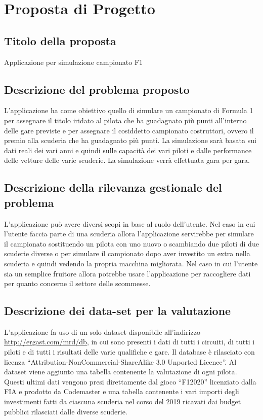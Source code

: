 \chapter{Proposta di Progetto}
\label{sec:proposta di progetto}

\section[Titolo della proposta]{Titolo della proposta} %
Applicazione per simulazione campionato F1
\section[Descrizione del problema proposto ]{Descrizione del problema proposto} %
L'applicazione ha come obiettivo quello di simulare un campionato di Formula 1 per assegnare il titolo iridato al pilota che ha guadagnato più punti all'interno delle gare previste e per assegnare il cosiddetto campionato costruttori, ovvero il premio alla scuderia che ha guadagnato più punti. La simulazione sarà basata sui dati reali dei vari anni e quindi sulle capacità dei vari piloti e dalle performance delle vetture delle varie scuderie. La simulazione verrà effettuata gara per gara.
\section[Descrizione della rilevanza gestionale del problema]{Descrizione della rilevanza gestionale del problema} %
L’applicazione può avere diversi scopi in base al ruolo dell’utente. Nel caso in cui l’utente faccia parte di una scuderia allora l’applicazione servirebbe per simulare il campionato sostituendo un pilota con uno nuovo o scambiando due piloti di due scuderie diverse o per simulare il campionato dopo aver investito un extra nella scuderia e quindi vedendo la propria macchina migliorata. Nel caso in cui l’utente sia un semplice fruitore allora potrebbe usare l’applicazione per raccogliere dati per quanto concerne il settore delle scommesse.
\section[Descrizione dei data-set per la valutazione]{Descrizione dei data-set per la valutazione} %
L’applicazione fa uso di un solo dataset disponibile all’indirizzo \\\url{http://ergast.com/mrd/db}, in cui sono presenti i dati di tutti i circuiti, di tutti i piloti e di tutti i risultati delle varie qualifiche e gare. Il database è rilasciato con licenza “Attribution-NonCommercial-ShareAlike 3.0 Unported Licence”. Al dataset viene aggiunto una tabella contenente la valutazione di ogni pilota. Questi ultimi dati vengono presi direttamente dal gioco “F12020” licenziato dalla FIA e prodotto da Codemaster e una tabella contenente i vari importi degli investimenti fatti da ciascuna scuderia nel corso del 2019 ricavati dai budget pubblici rilasciati dalle diverse scuderie.
